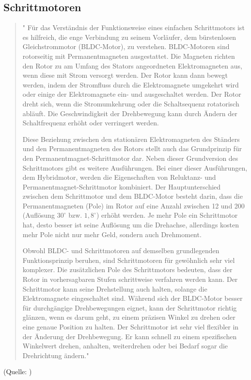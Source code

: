 \renewcommand{\autoren}{Severin Schendel	}
\newpage

\subsection{Schrittmotoren}

\begin{quote}
" Für das Verständnis der Funktionsweise eines einfachen Schrittmotors ist es hilfreich, die enge Verbindung zu seinem Vorläufer, dem bürstenlosen Gleichstrommotor (BLDC-Motor), zu verstehen. BLDC-Motoren sind rotorseitig mit Permanentmagneten ausgestattet. Die Magneten richten den Rotor zu am Umfang des Stators angeordneten Elektromagneten aus, wenn diese mit Strom versorgt werden. Der Rotor kann dann bewegt werden, indem der Stromfluss durch die Elektromagnete umgekehrt wird oder einige der Elektromagnete ein- und ausgeschaltet werden. Der Rotor dreht sich, wenn die Stromumkehrung oder die Schaltsequenz rotatorisch abläuft. Die Geschwindigkeit der Drehbewegung kann durch Ändern der Schaltfrequenz erhöht oder verringert werden.

Diese Beziehung zwischen den stationären Elektromagneten des Ständers und den Permanentmagneten des Rotors stellt auch das Grundprinzip für den Permanentmagnet-Schrittmotor dar. Neben dieser Grundversion des Schrittmotors gibt es weitere Ausführungen. Bei einer dieser Ausführungen, dem Hybridmotor, werden die Eigenschaften von Reluktanz- und Permanentmagnet-Schrittmotor kombiniert. Der Hauptunterschied zwischen dem Schrittmotor und dem BLDC-Motor besteht darin, dass die Permanentmagneten (Pole) im Rotor auf eine Anzahl zwischen 12 und 200 (Auflösung $30^\circ$ bzw. $1,8^\circ$) erhöht werden. Je mehr Pole ein Schrittmotor hat, desto besser ist seine Auflösung um die Drehachse, allerdings kosten mehr Pole nicht nur mehr Geld, sondern auch Drehmoment.

Obwohl BLDC- und Schrittmotoren auf demselben grundlegenden Funktionsprinzip beruhen, sind Schrittmotoren für gewöhnlich sehr viel komplexer. Die zusätzlichen Pole des Schrittmotors bedeuten, dass der Rotor in vorhersagbaren Stufen schrittweise verfahren werden kann. Der Schrittmotor kann seine Drehstellung auch halten, solange die Elektromagnete eingeschaltet sind. Während sich der BLDC-Motor besser für durchgängige Drehbewegungen eignet, kann der Schrittmotor richtig glänzen, wenn es darum geht, zu einem präzisen Winkel zu drehen oder eine genaue Position zu halten. Der Schrittmotor ist sehr viel flexibler in der Änderung der Drehbewegung. Er kann schnell zu einem spezifischen Winkelwert drehen, anhalten, weiterdrehen oder bei Bedarf sogar die Drehrichtung ändern."
\end{quote}

(Quelle: \cite{BLDCNanotec})

